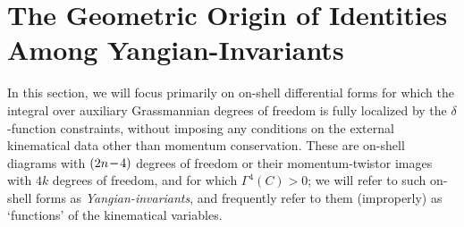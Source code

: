\documentclass[12pt,hyperref,compress]{JHEP3}
\newcommand{\mi}{{\rm\rule[2.4pt]{6pt}{0.65pt}}}
\begin{document}
{\newpage










\newpage
\section{The Geometric Origin of Identities Among Yangian-Invariants}\label{geometric_origin_of_identities_section}


In this section, we will focus primarily on on-shell differential forms for which the integral over auxiliary Grassmannian degrees of freedom is fully localized by the \mbox{$\delta$-function} constraints, without imposing any conditions on the external kinematical data other than momentum conservation. These are on-shell diagrams with $(2n\,\mi\,4)$ degrees of freedom or their momentum-twistor images with $4k$ degrees of freedom, and for which $\Gamma^4(C)>0$; we will refer to such on-shell forms as {\it Yangian-invariants}, and frequently refer to them (improperly) as `functions' of the kinematical variables.

}
\end{document}
